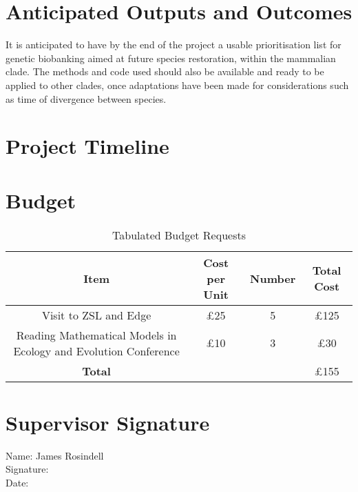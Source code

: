 \documentclass[11pt,titlepage]{article}
\begin{document}
	\section{Anticipated Outputs and Outcomes}
	It is anticipated to have by the end of the project a usable prioritisation list for genetic biobanking aimed at future species restoration, within the mammalian clade. The methods and code used should also be available and ready to be applied to other clades, once adaptations have been made for considerations such as time of divergence between species.

	\section{Project Timeline}
	
	\section{Budget}
	\begin{table}
		\begin{center}
			\caption{Tabulated Budget Requests}
			\begin{tabular}{|c|c|c|c|}
				\hline
				Item & Cost per Unit & Number & Total Cost \\
				\hline
				Visit to ZSL and Edge & £25 & 5 & £125 \\
				\hline
				Reading Mathematical Models in Ecology and Evolution Conference & £10 & 3 & £30 \\
				\hline
				\textbf{Total}& & & £155 \\
				\hline
			\end{tabular}
		\end{center}
	\end{table}
	
	\newpage
	\section{Supervisor Signature}
	
	Name: James Rosindell \\
	Signature: \\
	Date: \\
	
	
\end{document}
